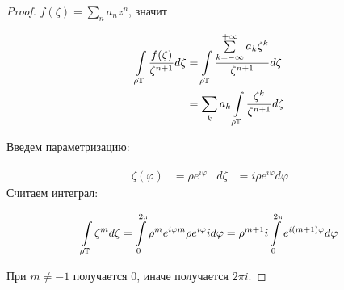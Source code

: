 \begin{proof} \quad 

    $f(\zeta) = \sum\limits_n a_nz^n$, значит

    \begin{align*} 
        \int\limits_{\rho\mathbb{T}} \frac{f(\zeta)}{\zeta^{n+1}} d\zeta 
        &= \int\limits_{\rho\mathbb{T}} \frac{\sum\limits_{k=-\infty}^{+\infty} a_k \zeta^k}{\zeta^{n+1}} d\zeta \\ 
        &= \sum\limits_k a_k \int\limits_{\rho\mathbb{T}} \frac{\zeta^k}{\zeta^{n+1}} d\zeta
    \end{align*}

    Введем параметризацию: 

    \begin{align*}
        \zeta(\varphi) &= \rho e^{i\varphi} & d \zeta & = i  \rho e^{i\varphi} d \varphi
    \end{align*}
    Считаем интеграл:
    
    \begin{gather*}
        \int\limits_{\rho\mathbb{T}} \zeta^m d\zeta = \int\limits_0^{2\pi}
        \rho^m e^{i\varphi m}\rho e^{i\varphi} i d\varphi
        = \rho^{m+1} i \int\limits_0^{2\pi } e^{i(m+1)\varphi} d\varphi
    \end{gather*}

    При $m \ne -1$ получается $0$, иначе получается $2\pi i$.
\end{proof}

\newpage